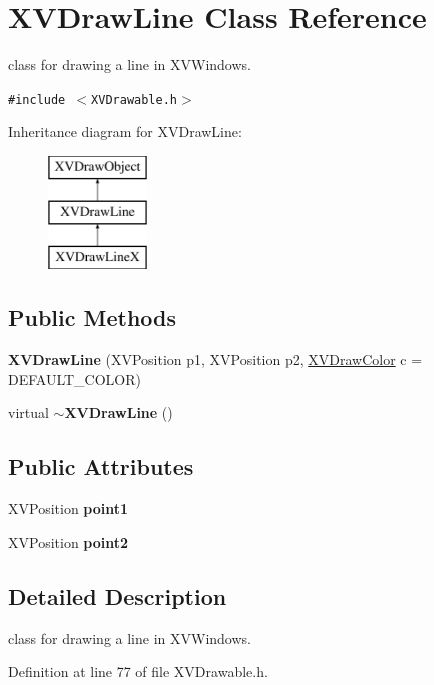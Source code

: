 \hypertarget{class_XVDrawLine}{
\section{XVDraw\-Line  Class Reference}
\label{XVDrawLine}
}
class for drawing a line in XVWindows. 


{\tt \#include $<$XVDrawable.h$>$}

Inheritance diagram for XVDraw\-Line:\begin{figure}[H]
\begin{center}
\leavevmode
\includegraphics[height=3cm]{class_XVDrawLine}
\end{center}
\end{figure}
\subsection*{Public Methods}
\begin{CompactItemize}
\item 
{\bf XVDraw\-Line} (XVPosition p1, XVPosition p2, \hyperlink{class_XVDrawColor}{XVDraw\-Color} c = DEFAULT\_\-COLOR)
\item 
virtual {\bf $\sim$XVDraw\-Line} ()
\end{CompactItemize}
\subsection*{Public Attributes}
\begin{CompactItemize}
\item 
XVPosition {\bf point1}
\item 
XVPosition {\bf point2}
\end{CompactItemize}


\subsection{Detailed Description}
class for drawing a line in XVWindows.





Definition at line 77 of file XVDrawable.h.


